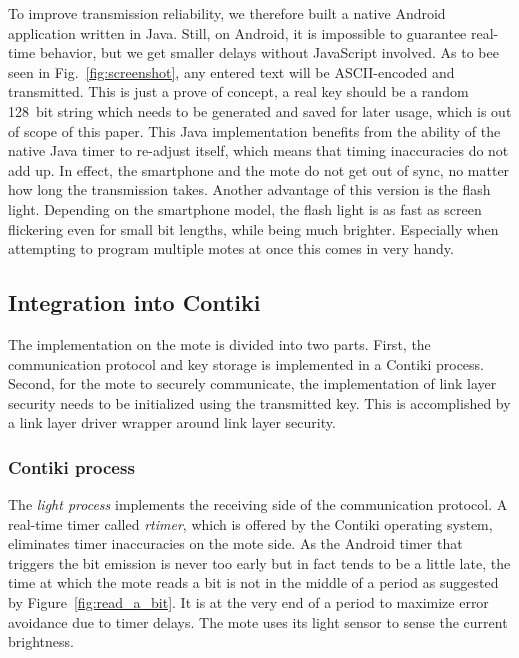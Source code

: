\documentclass{sig-alternate} %
\begin{document}
To improve transmission reliability, we therefore built a native Android application written in Java.
Still, on Android, it is impossible to guarantee real-time behavior, but we get smaller delays without JavaScript involved.
As to bee seen in Fig.~\ref{fig:screenshot}, any entered text will be ASCII-encoded and transmitted.
This is just a prove of concept, a real key should be a random 128~bit string which needs to be generated and saved for later usage, which is out of scope of this paper.
This Java implementation benefits from the ability of the native Java timer to re-adjust itself, which means that timing inaccuracies do not add up.
In effect, the smartphone and the mote do not get out of sync, no matter how long the transmission takes.
Another advantage of this version is the flash light.
Depending on the smartphone model, the flash light is as fast as screen flickering even for small bit lengths, while being much brighter.
Especially when attempting to program multiple motes at once this comes in very handy.


\subsection{Integration into Contiki}
\label{sub:mote}

The implementation on the mote is divided into two parts.
First, the communication protocol and key storage is implemented in a Contiki process.
Second, for the mote to securely communicate, the implementation of link layer security needs to be initialized using the transmitted key.
This is accomplished by a link layer driver wrapper around link layer security.

\subsubsection{Contiki process}
\label{ssub:contiki_process}

The \textit{light process} implements the receiving side of the communication protocol.
A real-time timer called \textit{rtimer}, which is offered by the Contiki operating system, eliminates timer inaccuracies on the mote side.
As the Android timer that triggers the bit emission is never too early but in fact tends to be a little late\cite{mongia2010reliable}, the time at which the mote reads a bit is not in the middle of a period as suggested by Figure~\ref{fig:read_a_bit}.
It is at the very end of a period to maximize error avoidance due to timer delays.
The mote uses its light sensor to sense the current brightness.
\end{document}
